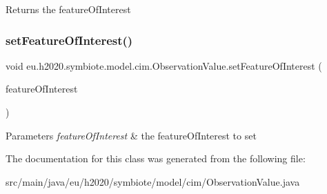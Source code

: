 \begin{DoxyReturn}{Returns}
the feature\+Of\+Interest 
\end{DoxyReturn}
\mbox{\label{classeu_1_1h2020_1_1symbiote_1_1model_1_1cim_1_1ObservationValue_a957aeb12313f1e520735a398fe9cdfd0}} 
\subsubsection{\texorpdfstring{set\+Feature\+Of\+Interest()}{setFeatureOfInterest()}}
{\footnotesize\ttfamily void eu.\+h2020.\+symbiote.\+model.\+cim.\+Observation\+Value.\+set\+Feature\+Of\+Interest (\begin{DoxyParamCaption}\item[{\hyperlink{classeu_1_1h2020_1_1symbiote_1_1model_1_1cim_1_1FeatureOfInterest}{Feature\+Of\+Interest}}]{feature\+Of\+Interest }\end{DoxyParamCaption})}


\begin{DoxyParams}{Parameters}
{\em feature\+Of\+Interest} & the feature\+Of\+Interest to set \\
\hline
\end{DoxyParams}


The documentation for this class was generated from the following file\+:\begin{DoxyCompactItemize}
\item 
src/main/java/eu/h2020/symbiote/model/cim/Observation\+Value.\+java\end{DoxyCompactItemize}
